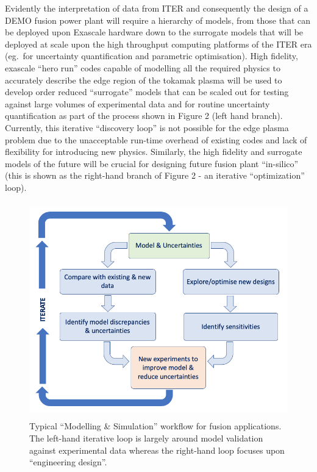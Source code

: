 Evidently the interpretation of data from ITER and consequently the design of a 
DEMO fusion power plant will require a hierarchy of models, from those that can 
be deployed upon Exascale hardware down to the surrogate models that will be deployed 
at scale upon the high throughput computing platforms of the ITER era (eg.\ for 
uncertainty quantification and parametric optimisation). High fidelity, exascale 
``hero run'' codes capable of modelling all the required physics to accurately 
describe the edge region of the tokamak plasma will be used to develop order reduced 
``surrogate'' models that can be scaled out for testing against large volumes of 
experimental data and for routine uncertainty quantification as part of the process 
shown in Figure 2 (left hand branch). Currently, this iterative ``discovery loop'' 
is not possible for the edge plasma problem due to the unacceptable run-time overhead 
of existing codes and lack of flexibility for introducing new physics. Similarly, 
the high fidelity and surrogate models of the future will be crucial for designing 
future fusion plant ``in-silico'' (this is shown as the right-hand branch of Figure 
2 - an iterative ``optimization'' loop). 

\begin{center}
\begin{figure}[htbp]
\centerline{\includegraphics[width=332pt, height=265pt, keepaspectratio=true]{../corpics/UQflow.png}}
\caption{Typical ``Modelling \& Simulation'' workflow for fusion applications. 
The left-hand iterative loop is largely around model validation against experimental 
data whereas the right-hand loop focuses upon ``engineering design''.}
\end{figure}
\end{center}

